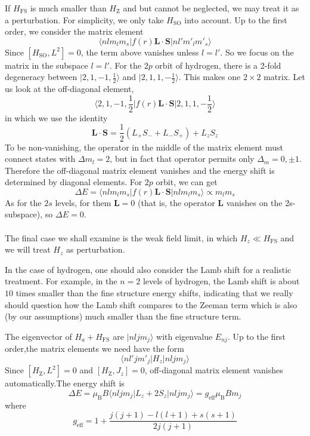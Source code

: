 If $H_{\mathrm{FS}}$ is much smaller than $H_{\mathrm{Z}}$ and but cannot be neglected, we may treat it as a perturbation. For simplicity, we only take $H_{\mathrm{SO}}$ into account. Up to the first order, we consider the matrix element
\[\langle n l m_l m_s | f(r)\bm{L}\cdot\bm{S}| n l' m'_l m'_s\rangle\]
Since $[H_{\mathrm{SO}},L^2] = 0$, the term above vanishes unless $l = l'$. So we focus on the matrix in the subspace $l = l'$. For the $2p$ orbit of hydrogen, there is a 2-fold degeneracy between $|2,1,-1,\frac{1}{2}\rangle$ and $|2,1,1,-\frac{1}{2}\rangle$.
This makes one $2 \times 2$ matrix. Let us look at the off-diagonal element,
\[\langle 2,1,-1,\frac{1}{2} | f(r)\bm{L}\cdot\bm{S}| 2,1,1,-\frac{1}{2}\rangle\]
in which we use the identity
\[\bm{L}\cdot\bm{S} = \frac{1}{2}(L_+S_-+L_-S_+)+L_zS_z\]
To be non-vanishing, the operator in the middle of the matrix element must connect states with $\Delta m_l = 2$, but in fact that operator permits only $\Delta_m = 0,\pm1$. Therefore the off-diagonal matrix element vanishes and the energy shift is determined by diagonal elements. For $2p$ orbit, we can get
\[\Delta E = \langle n l m_l m_s | f(r)\bm{L}\cdot\bm{S}| n l m_l m_s\rangle \propto m_lm_s\]
As for the $2s$ levels, for them $\bm{L} = 0$ (that is, the operator $\bm{L}$ vanishes on the 2s-subspace), so $\Delta E = 0$.\\ \\
The final case we shall examine is the weak field limit, in which $H_z \ll H_{\mathrm{FS}}$ and we will treat $H_z$ as perturbation.
\begin{note}
In the case of hydrogen, one should also consider the Lamb shift for a realistic treatment. For example, in the $n=2$ levels of hydrogen, the Lamb shift is about $10$ times smaller than the fine structure energy shifts, indicating that we really should question how the Lamb shift compares to the Zeeman term which is also (by our assumptions) much smaller than the fine structure term.
\end{note}
\noindent
The eigenvector of $H_a + H_{\mathrm{FS}}$ are $|nljm_j\rangle$ with eigenvalue $E_{nj}$. Up to the first order,the matrix elements we need have the form
\[\langle n l' j m'_j | H_z | n l j m_j\rangle\]
Since $[H_{\mathrm{Z}},L^2] = 0$ and $[H_{\mathrm{Z}},J_z] = 0$, off-diagonal matrix element vanishes automatically.The energy shift is
\[\Delta E = \mu_{\mathrm{B}} B\langle n l j m_j | L_z + 2S_z | n l j m_j\rangle = g_{\mathrm{eff}} \mu_{\mathrm{B}} B m_j\]
where
\[g_{\mathrm{eff}} = 1 + \frac{j(j+1)-l(l+1)+s(s+1)}{2j(j+1)}\]

